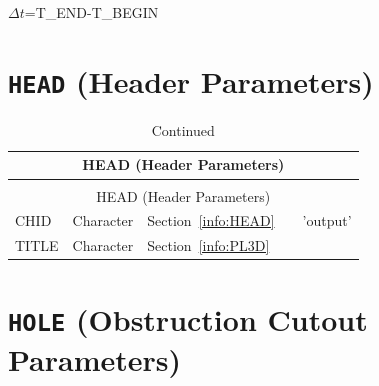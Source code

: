 \documentclass[11pt]{book}
\begin{document}
\noindent
$\Delta t$={\ct T\_END-T\_BEGIN}

\vspace{\baselineskip}

\section{\texorpdfstring{{\tt HEAD}}{HEAD} (Header Parameters)}


\begin{longtable}{@{\extracolsep{\fill}}|l|l|l|l|l|}
\caption[Header parameters ({\ct HEAD} namelist group)]{For more information see Section~\ref{info:HEAD}.}
\label{tbl:HEAD} \\
\hline
\multicolumn{5}{|c|}{{\ct HEAD} (Header Parameters)} \\
\hline \hline
\endfirsthead
\caption[]{Continued} \\
\hline
\multicolumn{5}{|c|}{{\ct HEAD} (Header Parameters)} \\
\hline \hline
\endhead
{\ct CHID}      & Character   & Section~\ref{info:HEAD}     &           & {\ct 'output'}    \\ \hline
{\ct TITLE}     & Character   & Section~\ref{info:PL3D}     &           &                   \\ \hline
\end{longtable}

\vspace{\baselineskip}


\newpage
\section{\texorpdfstring{{\tt HOLE}}{HOLE} (Obstruction Cutout Parameters)}
\end{document}
